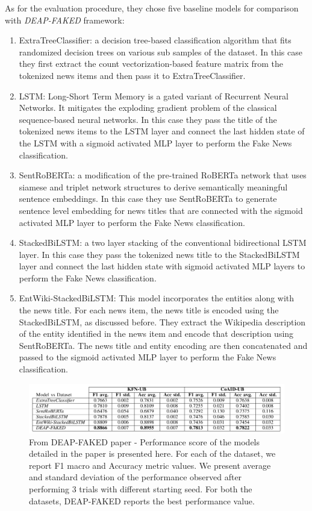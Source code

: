 \documentclass[10pt, english]{report}
\begin{document}
As for the evaluation procedure, they chose five baseline models for comparison with \textit{DEAP-FAKED} framework:

\begin{enumerate}
\item ExtraTreeClassifier: a decision tree-based classification algorithm that fits randomized decision trees on various sub samples of the dataset. In this case they first extract the count vectorization-based feature matrix from the tokenized news items and then pass it to ExtraTreeClassifier.
\item LSTM: Long-Short Term Memory is a gated variant of Recurrent Neural Networks. It mitigates the exploding gradient problem of the classical sequence-based neural networks. In this case they pass the title of the tokenized news items to the LSTM layer and connect the last hidden state of the LSTM with a sigmoid activated MLP layer to perform the Fake News classification.
\item SentRoBERTa: a modification of the pre-trained RoBERTa network that uses siamese and triplet network structures to derive semantically meaningful sentence embeddings. In this case they use SentRoBERTa to generate sentence level embedding for news titles that are connected with the sigmoid activated MLP layer to perform the Fake News classification.
\item StackedBiLSTM: a two layer stacking of the conventional bidirectional LSTM layer. In this case they pass the tokenized news title to the StackedBiLSTM layer and connect the last hidden state with sigmoid activated MLP layers to perform the Fake News classification.
\item EntWiki-StackedBiLSTM: This model incorporates the entities along with the news title. For each news item, the news title is encoded using the StackedBiLSTM, as discussed before. They extract the Wikipedia description of the entity identified in the news item and encode that description using SentRoBERTa. The news title and entity encoding are then concatenated and passed to the sigmoid activated MLP layer to perform the Fake News classification.
\end{enumerate}

\begin{figure}[H]
	\centering
	\includegraphics[scale=0.4]{img/deap_faked_evaluation.png}
	\caption{From DEAP-FAKED paper - Performance score of the models detailed in the paper is presented here. For each of the dataset, we report F1 macro and Accuracy metric values. We present average and standard deviation of the performance observed after performing 3 trials with different starting seed. For both the datasets, DEAP-FAKED reports the best performance value.}
\end{figure}
\end{document}
